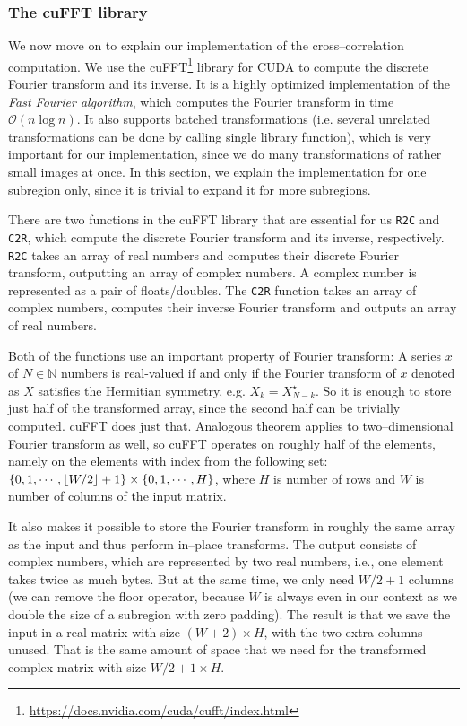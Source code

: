 \subsubsection{The cuFFT library}
We now move on to explain our implementation of the cross--correlation computation. We use the cuFFT\footnote{\url{https://docs.nvidia.com/cuda/cufft/index.html}} library for CUDA to compute the discrete Fourier transform and its inverse. It is a highly optimized implementation of the \emph{Fast Fourier algorithm}, which computes the Fourier transform in time $\mathcal{O}(n \log n)$. It also supports batched transformations (i.e. several unrelated transformations can be done by calling single library function), which is very important for our implementation, since we do many transformations of rather small images at once. In this section, we explain the implementation for one subregion only, since it is trivial to expand it for more subregions.

There are two functions in the cuFFT library that are essential for us \texttt{R2C} and \texttt{C2R}, which compute the discrete Fourier transform and its inverse, respectively. \texttt{R2C} takes an array of real numbers and computes their discrete Fourier transform, outputting an array of complex numbers. A complex number is represented as a pair of floats/doubles. The \texttt{C2R} function takes an array of complex numbers, computes their inverse Fourier transform and outputs an array of real numbers.

Both of the functions use an important property of Fourier transform: A series $x$ of $N \in \mathbb{N}$ numbers is real-valued if and only if the Fourier transform of $x$ denoted as $X$ satisfies the Hermitian symmetry, e.g. $X_k = X_{N-k}^\star$. So it is enough to store just half of the transformed array, since the second half can be trivially computed. cuFFT does just that. Analogous theorem applies to two--dimensional Fourier transform as well, so cuFFT operates on roughly half of the elements, namely on the elements with index from the following set: $\{0,1,\cdots, \lfloor W/2\rfloor + 1\} \times \{0, 1, \cdots, H\}$, where $H$ is number of rows and $W$ is number of columns of the input matrix.

It also makes it possible to store the Fourier transform in roughly the same array as the input and thus perform in--place transforms. The output consists of complex numbers, which are represented by two real numbers, i.e., one element takes twice as much bytes. But at the same time, we only need $W/2 + 1$ columns (we can remove the floor operator, because $W$ is always even in our context as we double the size of a subregion with zero padding). The result is that we save the input in a real matrix with size $(W+2) \times H$, with the two extra columns unused. That is the same amount of space that we need for the transformed complex matrix with size $W/2 + 1 \times H$.

